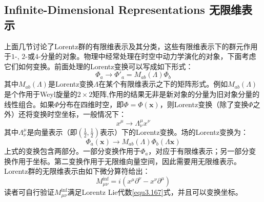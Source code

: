 \subsection[无限维表示]{Infinite-Dimensional Representations \quad 无限维表示}
\label{sec3.7.11}
上面几节讨论了Lorentz群的有限维表示及其分类，这些有限维表示下的群元作用于$1$-, $2$-或$4$-分量的对象。物理中经常处理在时空中动力学演化的对象，下面考虑它们如何变换。前面处理的Lorentz变换可以写成如下形式：
\begin{equation}
\label{equ3.237}
    \Phi_a \rightarrow \Phi'_a = M_{ab}(\Lambda) \Phi_b
\end{equation}
其中$M_{ab} (\Lambda)$是Lorentz变换$\Lambda$在某个有限维表示之下的矩阵形式。例如$M_{ab} (\Lambda)$是个作用于Weyl旋量的$2 \times 2$矩阵,作用的结果无非是新对象的分量为旧对象分量的线性组合。如果$\Phi$分布在四维时空，即$\Phi = \Phi(\mathbf{x})$，则Lorentz变换（除了变换$\Phi$之外）还将变换时空坐标，一般情况下：
\begin{equation}
\label{equ3.238}
    x^\mu \rightarrow \Lambda^\mu_\nu x^\nu
\end{equation}
其中$\Lambda^\mu_\nu$是向量表示（即$(\frac{1}{2}, \frac{1}{2})$表示）下的Lorentz变换。场的Lorentz变换为：
\begin{equation}
\label{equ3.239}
    \Phi_a (\mathbf{x})  \rightarrow M_{ab} (\Lambda) \Phi_b (\Lambda \mathbf{x})
\end{equation}
上式的变换包含两部分。一部分变换作用于$\Phi_a$，对应于有限维表示；另一部分变换作用于坐标。第二变换作用于无限维向量空间，因此需要用无限维表示。Lorentz群的无限维表示由如下微分算符给出：
\begin{equation}
\label{equ3.240}
    M^{\mathrm{inf}}_{\mu \nu} = i (x^\mu \partial^\nu - x^\nu \partial^\mu)
\end{equation}
读者可自行验证$M^{\mathrm{inf}}_{\mu \nu}$满足Lorentz Lie代数\ref{equ3.167}式，并且可以变换坐标。

